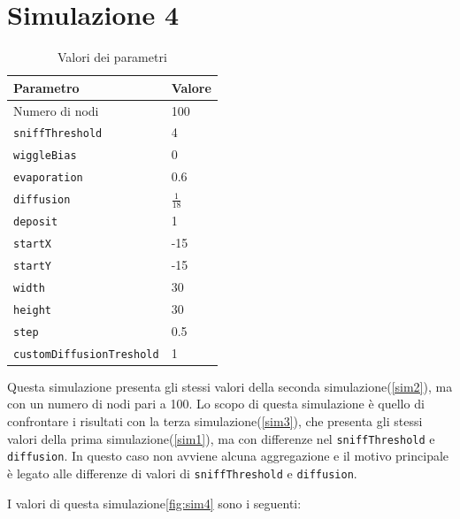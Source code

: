 \section{Simulazione 4}\label{sim4}
\begin{table}[ht]
    \centering
    \caption{Valori dei parametri}
    \begin{tabular}{ll}
        \hline
        Parametro                   & Valore \\
        \hline
        Numero di nodi              & 100    \\
        \texttt{sniffThreshold}     & 4      \\
        \texttt{wiggleBias}         & 0      \\
        \texttt{evaporation}        & 0.6    \\
        \texttt{diffusion}          & $\frac{1}{18}$ \\
        \texttt{deposit}            & 1      \\
        \texttt{startX}             & -15    \\
        \texttt{startY}             & -15    \\
        \texttt{width}              & 30     \\
        \texttt{height}             & 30     \\
        \texttt{step}               & 0.5    \\
        \texttt{customDiffusionTreshold} & 1 \\
        \hline
    \end{tabular}\label{tab:parametri4}
\end{table}

Questa simulazione presenta gli stessi valori della seconda simulazione\space(\cref{sim2}), ma con un numero di nodi pari a 100.
Lo scopo di questa simulazione è quello di confrontare i risultati con la terza simulazione\space(\cref{sim3}), che presenta gli stessi valori della prima simulazione\space(\cref{sim1}),
ma con differenze nel \texttt{sniffThreshold} e \texttt{diffusion}. In questo caso non avviene alcuna aggregazione e 
il motivo principale è legato alle differenze di valori di \texttt{sniffThreshold} e \texttt{diffusion}.

I valori di questa simulazione\space \cref{fig:sim4} sono i seguenti:


